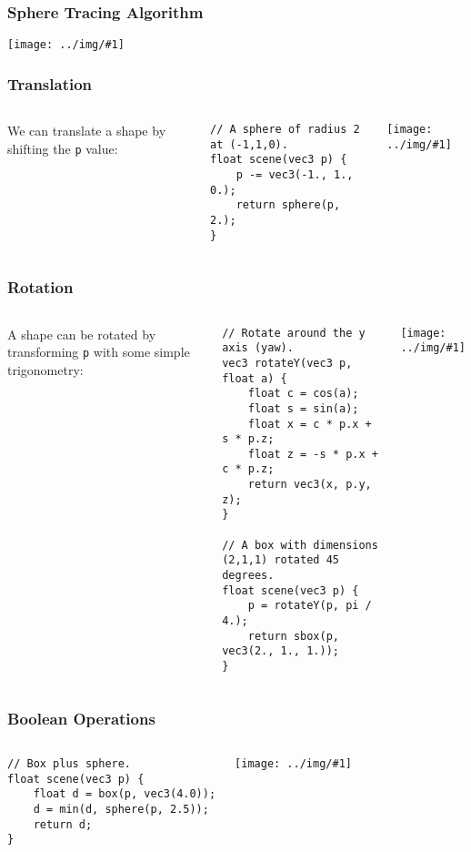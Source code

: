 \documentclass{beamer}
\newcommand\graphic[1]{\texttt{[image: ../img/\#1]}}
\begin{document}
\begin{frame}
    \frametitle{Sphere Tracing Algorithm}
    \graphic{ray-marching-overview.png}
\end{frame}

\begin{frame}[fragile]
    \frametitle{Translation}
    \begin{columns}
        We can translate a shape by shifting the \texttt{p} value:

        \begin{verbatim}
// A sphere of radius 2 at (-1,1,0).
float scene(vec3 p) {
    p -= vec3(-1., 1., 0.);
    return sphere(p, 2.);
}
        \end{verbatim}
        \graphic{translated-sphere.png}
    \end{columns}
\end{frame}

\begin{frame}[fragile]
    \frametitle{Rotation}
    \begin{columns}
        A shape can be rotated by transforming \texttt{p} with some simple
        trigonometry:


        \begin{verbatim}
// Rotate around the y axis (yaw).
vec3 rotateY(vec3 p, float a) {
    float c = cos(a);
    float s = sin(a);
    float x = c * p.x + s * p.z;
    float z = -s * p.x + c * p.z;
    return vec3(x, p.y, z);
}

// A box with dimensions (2,1,1) rotated 45 degrees.
float scene(vec3 p) {
    p = rotateY(p, pi / 4.);
    return sbox(p, vec3(2., 1., 1.));
}
        \end{verbatim}
        \graphic{rotated-box.png}
    \end{columns}
\end{frame}

\begin{frame}[fragile]
    \frametitle{Boolean Operations}
    \begin{columns}
        \begin{verbatim}
// Box plus sphere.
float scene(vec3 p) {
    float d = box(p, vec3(4.0));
    d = min(d, sphere(p, 2.5));
    return d;
}
        \end{verbatim}
        \graphic{box-plus-sphere.png}
    \end{columns}
\end{frame}
\end{document}
